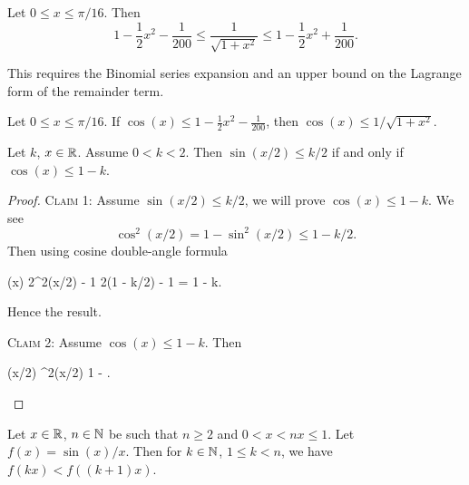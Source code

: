 \begin{proposition}
  Let $0\leq x\leq\pi/16$. Then
  \begin{equation}
1 - \frac{1}{2}x^{2} - \frac{1}{200} \leq\frac{1}{\sqrt{1 + x^{2}}}\leq1 - \frac{1}{2}x^{2} + \frac{1}{200}.
  \end{equation}
\end{proposition}

\begin{remark}
This requires the Binomial series expansion and an upper bound on the
Lagrange form of the remainder term.
\end{remark}

\begin{proposition}
Let $0\leq x\leq\pi/16$.
If $\cos(x)\leq 1 - \frac{1}{2}x^{2} - \frac{1}{200}$, then $\cos(x)\leq 1/\sqrt{1 + x^{2}}$.
\end{proposition}


\begin{proposition}
Let $k$, $x\in\mathbb{R}$. Assume $0<k<2$. Then $\sin(x/2)\leq k/2$ if and only if $\cos(x)\leq 1 - k$.
\end{proposition}

\begin{proof}
\textsc{Claim 1:} Assume $\sin(x/2)\leq k/2$, we will prove 
$\cos(x)\leq 1 - k$.
We see
\begin{equation}
\cos^{2}(x/2) = 1 - \sin^{2}(x/2)\leq 1 - k/2.
\end{equation}
Then using cosine double-angle formula
\begin{calculation}
  \cos(x)
2\cos^{2}(x/2) - 1
2(1 - k/2) - 1 = 1 - k.
\end{calculation}
Hence the result.

\textsc{Claim 2:} Assume $\cos(x)\leq 1 - k$. Then 
\begin{calculation}
\sin(x/2)
\sin^{2}(x/2)
1 - .\qedhere
\end{calculation}
\end{proof}

\begin{lemma}
Let $x\in\mathbb{R}$, $n\in\mathbb{N}$ be such that $n\geq2$ and $0<x<nx\leq1$.
Let $f(x) = \sin(x)/x$.
Then for $k\in\mathbb{N}$, $1\leq k < n$, we have $f(kx) < f((k+1)x)$.
\end{lemma}

